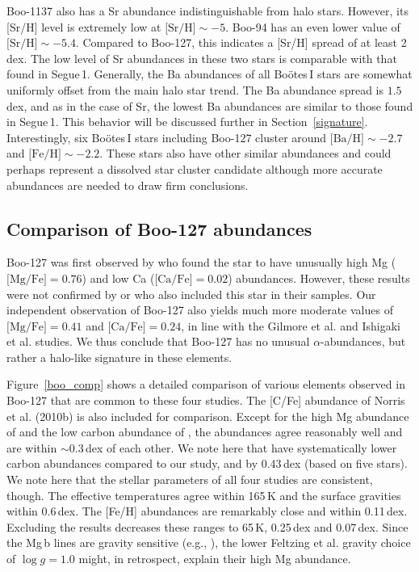 \documentclass[]{emulateapj}
\begin{document}
Boo-1137 also has a Sr abundance indistinguishable from halo
stars. However, its [Sr/H] level is extremely low at $\mbox{[Sr/H]}
\sim -5$. Boo-94 has an even lower value of $\mbox{[Sr/H]} \sim
-5.4$. Compared to Boo-127, this indicates a [Sr/H] spread of at least
2\,dex. The low level of Sr abundances in these two stars is
comparable with that found in Segue\,1. Generally, the Ba abundances
of all Bo\"otes\,I stars are somewhat uniformly offset from the main
halo star trend. The Ba abundance spread is $1.5$\,dex, and as in the
case of Sr, the lowest Ba abundances are similar to those found in
Segue\,1. This behavior will be discussed further in
Section~\ref{signature}. Interestingly, six Bo\"otes\,I stars
including Boo-127 cluster around $\mbox{[Ba/H]} \sim -2.7$ and
$\mbox{[Fe/H]} \sim-2.2$. These stars also have other similar
abundances and could perhaps represent a dissolved star cluster
candidate \citep{blandhawthorn10b,karlsson12} although more accurate
abundances are needed to draw firm conclusions.






\subsection{Comparison of Boo-127 abundances}\label{sec:comp}

Boo-127 was first observed by \citet{feltzing09} who found the star to
have unusually high Mg ($\mbox{[Mg/Fe]}=0.76$) and low Ca
($\mbox{[Ca/Fe]}=0.02$) abundances. However, these results were not
confirmed by \citet{gilmore13} or \citet{ishigaki14} who also included
this star in their samples.  Our independent observation of Boo-127 also yields
much more moderate values of $\mbox{[Mg/Fe]}=0.41$ and
$\mbox{[Ca/Fe]}=0.24$, in line with the Gilmore et al. and Ishigaki et
al. studies.  We thus conclude that Boo-127 has no unusual
$\alpha$-abundances, but rather a halo-like signature in these
elements.

Figure~\ref{boo_comp} shows a detailed comparison of various elements
observed in Boo-127 that are common to these four studies. The [C/Fe]
abundance of Norris et al. (2010b) is also included for
comparison. Except for the high Mg abundance of \citet{feltzing09} and
the low carbon abundance of \citet{ishigaki14}, the abundances agree
reasonably well and are within $\sim0.3$\,dex of each other. We note
here that \citet{ishigaki14} have systematically lower carbon
abundances compared to our study, \citet{norris10_booseg} and
\citet{lai11} by 0.43\,dex (based on five stars).  We note here that
the stellar parameters of all four studies are consistent, though. The
effective temperatures agree within 165\,K and the surface gravities
within 0.6\,dex. The [Fe/H] abundances are remarkably close and within
0.11\,dex. Excluding the \citet{feltzing09} results decreases these
ranges to 65\,K, 0.25\,dex and 0.07\,dex. Since the Mg\,b lines are
gravity sensitive (e.g., \citealt{hollek11}), the lower Feltzing et
al. gravity choice of $\log g=1.0$ might, in retrospect, explain their
high Mg abundance.
\end{document}
